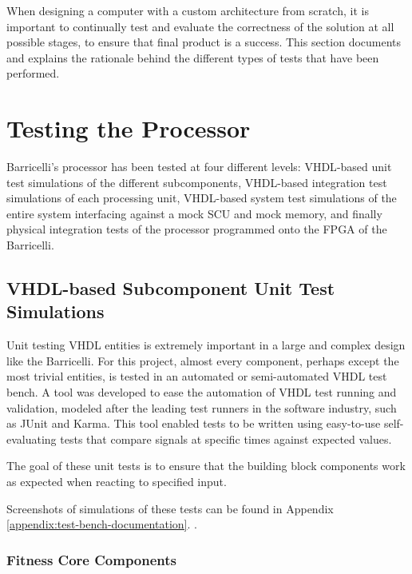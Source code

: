 When designing a computer with a custom architecture from scratch, it is important to continually test and evaluate the correctness of the solution at all possible stages, to ensure that final product is a success.
This section documents and explains the rationale behind the different types of tests that have been performed.

\section{Testing the Processor}

Barricelli's processor has been tested at four different levels: \gls{VHDL}-based unit test simulations of the different subcomponents,  \gls{VHDL}-based integration test simulations of each processing unit, \gls{VHDL}-based system test simulations of the entire system interfacing against a mock SCU and mock memory, and finally physical integration tests of the processor programmed onto the FPGA of the Barricelli.



\subsection{\gls{VHDL}-based Subcomponent Unit Test Simulations}

Unit testing VHDL entities is extremely important in a large and complex design like the Barricelli.
For this project, almost every component, perhaps except the most trivial entities, is tested in an automated or semi-automated VHDL test bench.
A tool was developed to ease the automation of VHDL test running and validation, modeled after the leading test runners in the software industry, such as JUnit\cite{junit} and Karma\cite{karma}.
This tool enabled tests to be written using easy-to-use self-evaluating tests that compare signals at specific times against expected values.

The goal of these unit tests is to ensure that the building block components work as expected when reacting to specified input.

Screenshots of simulations of these tests can be found in Appendix \ref{appendix:test-bench-documentation}.
.

\subsubsection{Fitness Core Components}


